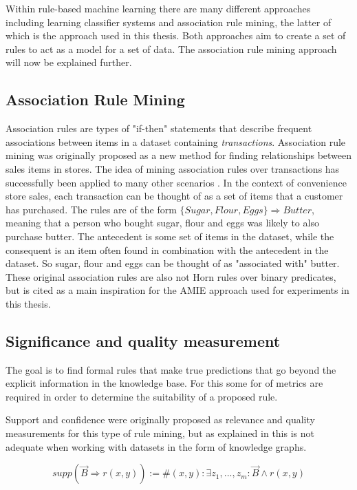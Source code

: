 Within rule-based machine learning there are many different approaches including learning classifier systems\cite{sigaud2007learning} and association rule mining\cite{agrawal1993mining}, the latter of which is the approach used in this thesis. Both approaches aim to create a set of rules to act as a model for a set of data. The association rule mining approach will now be explained further.


\subsection{Association Rule Mining}
Association rules \cite{agrawal1993mining} are types of "if-then" statements that describe frequent associations between items in a dataset containing \textit{transactions}. Association rule mining was originally proposed as a new method for finding relationships between sales items in stores. The idea of mining association rules over transactions has successfully been applied to many other scenarios \cite{altaf2017applications, lin2002efficient}. In the context of convenience store sales, each transaction can be thought of as a set of items that a customer has purchased. The rules are of the form $\{Sugar, Flour, Eggs\} \Rightarrow Butter$, meaning that a person who bought sugar, flour and eggs was likely to also purchase butter. The antecedent is some set of items in the dataset, while the consequent is an item often found in combination with the antecedent in the dataset.  So sugar, flour and eggs can be thought of as "associated with" butter. These original association rules are also not Horn rules over binary predicates, but is cited as a main inspiration for the AMIE approach used for experiments in this thesis.

\subsection{Significance and quality measurement}
The goal is to find formal rules that make true predictions that go beyond the explicit information in the knowledge base. For this some for of metrics are required in order to determine the suitability of a proposed rule.




Support and confidence were originally proposed as relevance and quality measurements for this type of rule mining, but as explained in  this is not adequate when working with datasets in the form of knowledge graphs.

\[supp(\vec{B}\Rightarrow r(x, y)) :=  \# (x, y) : \exists z_1 , ...,z_m : \vec{B} \wedge r(x, y)\]

